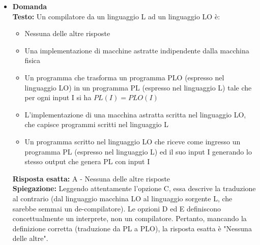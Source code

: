 \documentclass[12pt, a4paper]{article}
\newcounter{domandateoria}
\begin{document}
\begin{itemize}
    \item {}\textbf{Domanda \thedomandateoria} \\
    \textbf{Testo:} Un compilatore da un linguaggio L ad un linguaggio LO è:
    \begin{itemize}
        \item[A)] Nessuna delle altre risposte
        \item[B)] Una implementazione di macchine astratte indipendente dalla macchina fisica
        \item[C)] Un programma che trasforma un programma PLO (espresso nel linguaggio LO) in un programma PL (espresso nel linguaggio L) tale che per ogni input I si ha $PL(I)=PLO(I)$
        \item[D)] L'implementazione di una macchina astratta scritta nel linguaggio LO, che capisce programmi scritti nel linguaggio L
        \item[E)] Un programma scritto nel linguaggio LO che riceve come ingresso un programma PL (espresso nel linguaggio L) ed il suo input I generando lo stesso output che genera PL con input I
    \end{itemize}
    \textbf{Risposta esatta:} A - Nessuna delle altre risposte \\
    \textbf{Spiegazione:} Leggendo attentamente l'opzione C, essa descrive la traduzione al contrario (dal linguaggio macchina LO al linguaggio sorgente L, che sarebbe semmai un de-compilatore). Le opzioni D ed E definiscono concettualmente un interprete, non un compilatore. Pertanto, mancando la definizione corretta (traduzione da PL a PLO), la risposta esatta è "Nessuna delle altre".
    \vspace{0.3cm}


\end{itemize}
\end{document}
